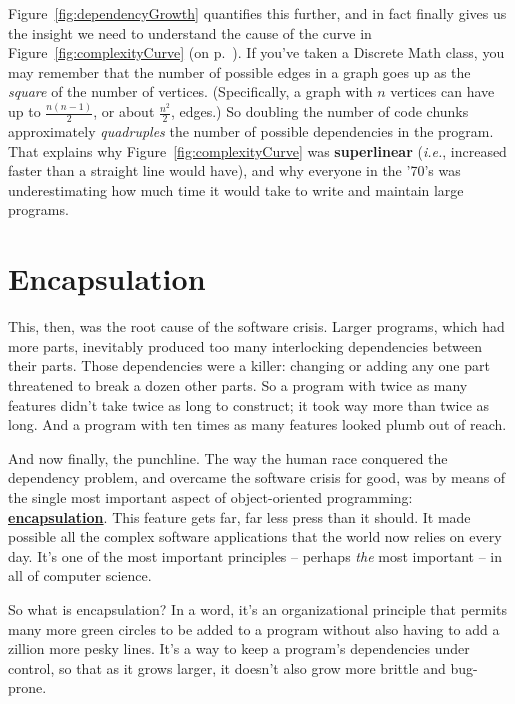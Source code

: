 Figure~\ref{fig:dependencyGrowth} quantifies this further, and in fact finally
gives us the insight we need to understand the cause of the curve in
Figure~\ref{fig:complexityCurve} (on p.~\pageref{fig:complexityCurve}). If
you've taken a Discrete Math class, you may remember that the number of
possible edges in a graph goes up as the \textit{square} of the number of
vertices. (Specifically, a graph with $n$ vertices can have up to
$\frac{n(n-1)}{2}$, or about $\frac{n^2}{2}$, edges.) So doubling the
number of code chunks approximately \textit{quadruples} the number of possible
dependencies in the program. That explains why
Figure~\ref{fig:complexityCurve} was \textbf{superlinear} (\textit{i.e.},
increased faster than a straight line would have), and why everyone in the
'70's was underestimating how much time it would take to write and maintain
large programs.

\section{Encapsulation}

This, then, was the root cause of the software crisis. Larger programs, which
had more parts, inevitably produced too many interlocking dependencies between
their parts. Those dependencies were a killer: changing or adding any one part
threatened to break a dozen other parts. So a program with twice as many
features didn't take twice as long to construct; it took way more than twice
as long. And a program with ten times as many features looked plumb out of
reach.

And now finally, the punchline. The way the human race conquered the
dependency problem, and overcame the software crisis for good, was by means of
the single most important aspect of object-oriented programming:
\underline{\textbf{encapsulation}}. This feature gets far, far less press than
it should. It made possible all the complex software applications that the
world now relies on every day. It's one of the most important principles --
perhaps \textit{the} most important -- in all of computer science.

So what is encapsulation? In a word, it's an organizational principle that
permits many more green circles to be added to a program without also having
to add a zillion more pesky lines. It's a way to keep a program's dependencies
under control, so that as it grows larger, it doesn't also grow more brittle
and bug-prone.

